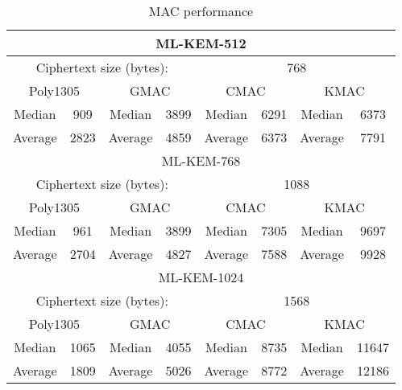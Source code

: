 \documentclass[floatrow,journal=tches,submission]{iacrtrans}
\begin{document}
\begin{table}[H]
    \caption{MAC performance}\label{tbl:mac-performance}
    \begin{tabular}{|c|c|c|c|c|c|c|c|}
        \hline
        \multicolumn{8}{|c|}{ML-KEM-512} \\
        \hline
        \multicolumn{4}{|c|}{Ciphertext size (bytes): }
        & \multicolumn{4}{|c|}{768} \\
        \hline
        \multicolumn{2}{|c|}{Poly1305} 
        & \multicolumn{2}{|c|}{GMAC} 
        & \multicolumn{2}{|c|}{CMAC} 
        & \multicolumn{2}{|c|}{KMAC} \\
        \hline
        Median & 909 
        & Median & 3899 
        & Median & 6291 
        & Median & 6373\\
        \hline
        Average & 2823 
        & Average & 4859 
        & Average & 6373 
        & Average & 7791 \\
        \hline
        \hline
        \multicolumn{8}{|c|}{ML-KEM-768} \\
        \hline
        \multicolumn{4}{|c|}{Ciphertext size (bytes): }
        & \multicolumn{4}{|c|}{1088} \\
        \hline
        \multicolumn{2}{|c|}{Poly1305} 
        & \multicolumn{2}{|c|}{GMAC} 
        & \multicolumn{2}{|c|}{CMAC} 
        & \multicolumn{2}{|c|}{KMAC} \\
        \hline
        Median & 961 
        & Median & 3899 
        & Median & 7305 
        & Median & 9697 \\
        \hline
        Average & 2704 
        & Average & 4827 
        & Average & 7588 
        & Average & 9928 \\
        \hline
        \hline
        \multicolumn{8}{|c|}{ML-KEM-1024} \\
        \hline
        \multicolumn{4}{|c|}{Ciphertext size (bytes): }
        & \multicolumn{4}{|c|}{1568} \\
        \hline
        \multicolumn{2}{|c|}{Poly1305} 
        & \multicolumn{2}{|c|}{GMAC} 
        & \multicolumn{2}{|c|}{CMAC} 
        & \multicolumn{2}{|c|}{KMAC} \\
        \hline
        Median & 1065 
        & Median & 4055 
        & Median & 8735 
        & Median & 11647 \\
        \hline
        Average & 1809 
        & Average & 5026 
        & Average & 8772 
        & Average & 12186 \\
        \hline
    \end{tabular}
\end{table}
\end{document}
